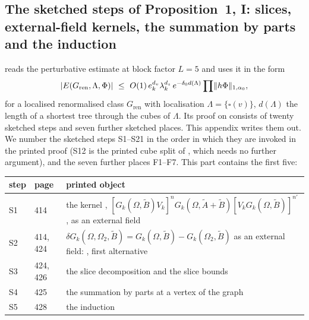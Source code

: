 
\subsection{The sketched steps of Proposition~1, I: slices, external-field kernels, the summation by parts and the induction}\label{sup1:sec}

 reads the perturbative estimate \cite[Prop.~1, (1.33)]{Ba3} at block factor $L=5$ and uses it in the form
\[
|E(G_{\mathrm{ren}},\Lambda,\Phi)|\ \le\ O(1)\,e_k^{d_v}\lambda_k^{d_s}\,e^{-\delta_0d(\Lambda)}\prod\norm{h\Phi}_{1,\alpha_0},
\]
for a localised renormalised class $G_{\mathrm{ren}}$ with localisation $\Lambda=\{\square(v)\}$, $d(\Lambda)$ the length of a shortest tree through the cubes of $\Lambda$. Its proof on \cite[pp.~420--445]{Ba3} consists of twenty sketched steps and seven further sketched places. This appendix writes them out. We number the sketched steps S1--S21 in the order in which they are invoked in the printed proof (S12 is the printed cube split of \cite[p.~433]{Ba3}, which needs no further argument), and the seven further places F1--F7. This part contains the first five:

\begin{center}
\begin{tabular}{lll}
step & \cite{Ba3} page & printed object\\\hline
S1 & 414 & the kernel \cite[(1.16)]{Ba3}, $[G_k(\Omega,\tilde B)V_k]^nG_k(\Omega,\tilde A+\tilde B)[V_kG_k(\Omega,\tilde B)]^{n'}$, as an external field\\
S2 & 414, 424 & $\delta G_k(\Omega,\Omega_2,\tilde B)=G_k(\Omega,\tilde B)-G_k(\Omega_2,\tilde B)$ as an external field: \cite[(2.5)]{Ba3}, first alternative\\
S3 & 424, 426 & the slice decomposition \cite[(2.6)]{Ba3} and the slice bounds \cite[(2.10)--(2.12)]{Ba3}\\
S4 & 425 & the summation by parts \cite[(2.8)--(2.9)]{Ba3} at a vertex of the graph \cite[(2.4)]{Ba3}\\
S5 & 428 & the induction \cite[(2.16)]{Ba3}
\end{tabular}
\end{center}

